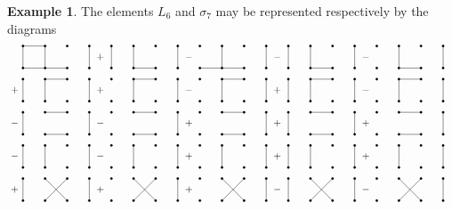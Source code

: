 \documentclass[11pt,a4paper,reqno,svgnames]{amsart}
\theoremstyle{plain}
\theoremstyle{definition}
\newtheorem{example}[theorem]{Example}
\numberwithin{equation}{section}
\begin{document}
\begin{example}
The elements $L_6$ and $\sigma_7$ may be represented respectively by the diagrams 
\begin{align*}
&\begin{matrix}
\begin{tikzpicture}
\foreach \x in {0,0.8,1.6,...,15.6} 
	{
	\foreach \y in {0,-1.2,...,-4.8}
		{
		\filldraw [black] (\x,\y) circle (1.1pt);
		}
	}
\foreach \x in {0,0.8,1.6,...,15.6} 
	{
	\foreach \y in {-0.8,-2.0,...,-5.6}
		{
		\filldraw [black] (\x,\y) circle (1.1pt);
		}
	}	
\foreach \x in {1.6,4.8,...,14.4} 
	{
	\foreach \y in {-0.8,-2.0,...,-5.6}
		{
		\draw (0.8+\x,\y) -- (0.8+\x,0.8+\y);
		}
	}	
\foreach \x in {0.8,4.0,...,13.6}
	{
	\draw (\x,-4.8) -- (0.8+\x,-5.6);
	}
\foreach \x in {0.8,4.0,...,13.6}
	{
	\draw (\x,-5.6) -- (0.8+\x,-4.8);
	}
\foreach \x in {0.8,4.0,...,13.6}
	{
	\draw (\x,-2.4) -- (0.8+\x,-2.4);
	}
\foreach \x in {0.8,4.0,...,13.6}
	{
	\draw (\x,-3.2) -- (0.8+\x,-3.2);
	}
\foreach \x in {0.8,4.0,...,13.6}
	{
	\draw (\x,-1.2) -- (0.8+\x,-1.2);
	}
\foreach \x in {0.8,4.0,...,13.6}
	{
	\draw (\x,-0.8) -- (0.8+\x,-0.8);
	}
\foreach \y in {-0,-1.2,...,-4.8}
	{
	\draw (0,\y) -- (0,-0.8+\y);
	}
\foreach \x in {0.8,4.0,...,13.6}
	{
	\draw (\x,0) -- (\x,-0.8);
	}
\foreach \x in {0.8,4.0,...,13.6}
	{
	\draw (\x,-1.2) -- (\x,-2.0);
	}
\foreach \x in {0.8,4.0,...,13.6}
	{
	\draw (\x,-3.6) -- (\x,-4.4);
	}
\foreach \y in {-0,-1.2,...,-4.8}
	{
	\draw (9.6,\y) -- (9.6,-0.8+\y);
	}
\node at (-0.3,-1.6) {$+\color{black}$};
\node at (-0.3,-2.8) {$-\color{black}$};
\node at (-0.3,-4.0) {$-\color{black}$};
\node at (-0.3,-5.2) {$+\color{black}$};
\node at (2.8,-0.4) {$+ \color{black}$};
\node at (2.8,-1.6) {$+ \color{black}$};
\node at (2.8,-2.8) {$- \color{black}$};
\node at (2.8,-4.0) {$- \color{black}$};
\node at (2.8,-5.2) {$+ \color{black}$};
\node at (6,-0.4) {$- \color{black}$};
\node at (6,-1.6) {$- \color{black}$};
\node at (6,-2.8) {$+ \color{black}$};
\node at (6,-4.0) {$+ \color{black}$};
\node at (6,-5.2) {$+ \color{black}$};
\node at (9.2,-0.4) {$- \color{black}$};
\node at (9.2,-1.6) {$+ \color{black}$};
\node at (9.2,-2.8) {$+ \color{black}$};
\node at (9.2,-4.0) {$+ \color{black}$};
\node at (9.2,-5.2) {$- \color{black}$};
\node at (12.4,-0.4) {$- \color{black}$};
\node at (12.4,-1.6) {$- \color{black}$};
\node at (12.4,-2.8) {$+ \color{black}$};
\node at (12.4,-4.0) {$+ \color{black}$};
\node at (12.4,-5.2) {$- \color{black}$};
\draw (0.0,0.0) -- (0.8,0.0);
\draw (3.2,0.0) -- (3.2,-0.8);
\draw (0.0,-0.8) -- (0.8,-0.8);
\draw (6.4,-0.8) -- (7.2,-0.8);

\end{tikzpicture}
\end{matrix}
\end{align*}
\end{example}
\end{document}
